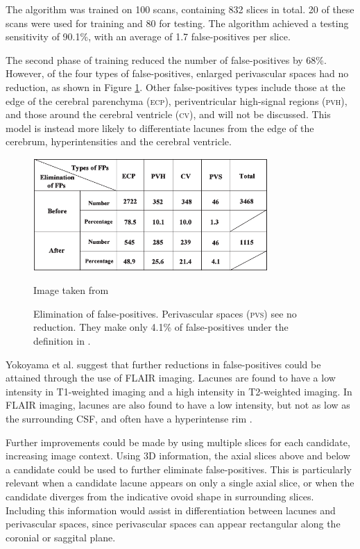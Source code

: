 The algorithm was trained on 100 scans, containing 832 slices in total. 20 of these scans were used for training and 80 for testing. The algorithm achieved a testing sensitivity of 90.1\%, with an average of 1.7 false-positives per slice.

The second phase of training reduced the number of false-positives by 68\%. However, of the four types of false-positives, enlarged perivascular spaces had no reduction, as shown in Figure \ref{litrev-yokoyama-fps}. Other false-positives types include those at the edge of the cerebral parenchyma (\textsc{ecp}), periventricular high-signal regions (\textsc{pvh}), and those around the cerebral ventricle (\textsc{cv}), and will not be discussed. This model is instead more likely to differentiate lacunes from the edge of the cerebrum, hyperintensities and the cerebral ventricle.

\begin{figure}[ht]
	\centering
	\includegraphics[width=0.8\textwidth]{Images/5_yokoyama2007testing.png}
	\caption{Elimination of false-positives. Perivascular spaces (\textsc{pvs}) see no reduction. They make only 4.1\% of false-positives under the definition in \cite{Yokoyama2007}.}
	\small Image taken from \cite{Yokoyama2007}
	\label{litrev-yokoyama-fps}
\end{figure}

Yokoyama et al. suggest that further reductions in false-positives could be attained through the use of FLAIR imaging. Lacunes are found to have a low intensity in T1-weighted imaging and a high intensity in T2-weighted imaging. In FLAIR imaging, lacunes are also found to have a low intensity, but not as low as the surrounding CSF, and often have a hyperintense rim \cite{WardlawJ.M.2013Nsfr}. 

Further improvements could be made by using multiple slices for each candidate, increasing image context. Using 3D information, the axial slices above and below a candidate could be used to further eliminate false-positives. This is particularly relevant when a candidate lacune appears on only a single axial slice, or when the candidate diverges from the indicative ovoid shape in surrounding slices. Including this information would assist in differentiation between lacunes and perivascular spaces, since perivascular spaces can appear rectangular along the coronial or saggital plane.

